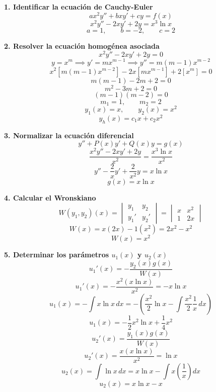 \documentclass[11pt,a4paper]{article}
\newenvironment{solucion}[1][Solución Detallada]{%
    \vspace{1.5mm}%
    \noindent{\large\textbf{Solución:}}\par\vspace{1.5mm}%
}{%
    \par\vspace{3mm}%
}
\begin{document}
\begin{solucion}

\textbf{\large 1. Identificar la ecuación de Cauchy-Euler}
\[
\boxed{a x^2 y'' + b x y' + c y = f(x)}
\]
\[
x^2 y'' - 2x y' + 2y = x^3 \ln x
\]
\[
a = 1, \qquad b = -2, \qquad c = 2
\]

\vspace{3.5mm}

\textbf{\large 2. Resolver la ecuación homogénea asociada}
\[
x^2 y'' - 2x y' + 2y = 0
\]
\[
y = x^m \implies y' = m x^{m-1} \implies y'' = m(m-1)x^{m-2}
\]
\[
x^2 [m(m-1)x^{m-2}] - 2x [m x^{m-1}] + 2 [x^m] = 0
\]
\[
m(m-1) - 2m + 2 = 0
\]
\[
m^2 - 3m + 2 = 0
\]
\[
(m - 1)(m - 2) = 0
\]
\[
m_1 = 1, \qquad m_2 = 2
\]
\[
y_1(x) = x, \qquad y_2(x) = x^2
\]
\[
\boxed{y_h(x) = c_1 x + c_2 x^2}
\]

\vspace{3.5mm}

\textbf{\large 3. Normalizar la ecuación diferencial}
\[
y'' + P(x)y' + Q(x)y = g(x)
\]
\[
\frac{x^2 y'' - 2x y' + 2y}{x^2} = \frac{x^3 \ln x}{x^2}
\]
\[
y'' - \frac{2}{x}y' + \frac{2}{x^2}y = x \ln x
\]
\[
\boxed{g(x) = x \ln x}
\]

\vspace{3.5mm}

\textbf{\large 4. Calcular el Wronskiano}
\[
W(y_1, y_2)(x) = \begin{vmatrix} y_1 & y_2 \\ y_1' & y_2' \end{vmatrix} = \begin{vmatrix} x & x^2 \\ 1 & 2x \end{vmatrix}
\]
\[
W(x) = x(2x) - 1(x^2) = 2x^2 - x^2
\]
\[
\boxed{W(x) = x^2}
\]

\vspace{3.5mm}

\textbf{\large 5. Determinar los parámetros $u_1(x)$ y $u_2(x)$}
\[
\boxed{u_1'(x) = -\frac{y_2(x) g(x)}{W(x)}}
\]
\[
u_1'(x) = -\frac{x^2 (x \ln x)}{x^2} = -x \ln x
\]
\[
u_1(x) = -\int x \ln x\, dx = -\left(\frac{x^2}{2}\ln x - \int \frac{x^2}{2}\frac{1}{x}\, dx\right)
\]
\[
\boxed{u_1(x) = -\frac{1}{2}x^2 \ln x + \frac{1}{4}x^2}
\]
\[
\boxed{u_2'(x) = \frac{y_1(x) g(x)}{W(x)}}
\]
\[
u_2'(x) = \frac{x (x \ln x)}{x^2} = \ln x
\]
\[
u_2(x) = \int \ln x\, dx = x \ln x - \int x\left(\frac{1}{x}\right) dx
\]
\[
\boxed{u_2(x) = x \ln x - x}
\]

\vspace{3.5mm}


\end{solucion}
\end{document}
